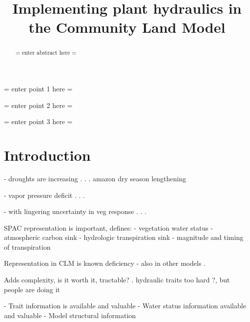 \documentclass[draft,linenumbers]{agujournal}
\begin{document}
\title{Implementing plant hydraulics in the Community Land Model}



\begin{keypoints}
\item = enter point 1 here = 
\item = enter point 2 here = 
\item = enter point 3 here = 
\end{keypoints}


\begin{abstract}
= enter abstract here =
\end{abstract}


\section{Introduction}



 - droughts are increasing 
      . \citep{cook2015}
      . \citep{dai2013}
      . amazon dry season lengthening \citep{fu2013}

 - vapor pressure deficit 
      . \citep{mcdowell2015}
      . \citep{novick2016b}
      . \citep{williams2013}

 - with lingering uncertainty in veg response
      . \citep{dekauwe2017}
      . \citep{friedlingstein2014}
      . \citep{anderegg2015b}


SPAC representation is important, defines:
  - vegetation water status
  - atmospheric carbon sink
  - hydrologic transpiration sink
  - magnitude and timing of transpiration

Representation in CLM is known deficiency
  - also in other models
      . \citep{powell2013,ukkola2016}


Adds complexity, is it worth it, tractable?
       . hydraulic traits too hard \citep{drake2017}?, but people are doing it \citep{xu2016,christoffersen2016}

  - Trait information is available \citep{kattge2011,anderegg2015a} and valuable \citep{choat2012}
  - Water status information available \citep{konings2016,grant2016} and valuable \citep{momen2017,konings2017b}
  - Model structural information
  
\end{document}
